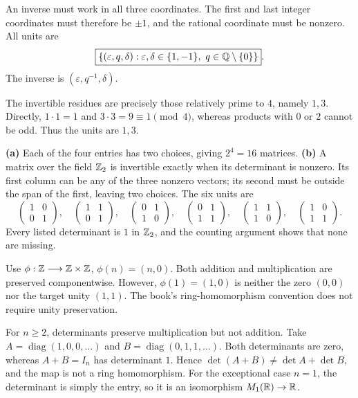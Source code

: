 An inverse must work in all three coordinates. The first and last integer coordinates must therefore be $\pm1$, and the rational coordinate must be nonzero. All units are
\[\boxed{\{(\varepsilon,q,\delta):\varepsilon,\delta\in\{1,-1\},\ q\in\Q\setminus\{0\}\}}.\]
The inverse is $(\varepsilon,q^{-1},\delta)$.

The invertible residues are precisely those relatively prime to $4$, namely $1,3$. Directly, $1\cdot1=1$ and $3\cdot3=9\equiv1\pmod4$, whereas products with $0$ or $2$ cannot be odd. Thus the units are $\boxed{1,3}$.

\textbf{(a)} Each of the four entries has two choices, giving $2^4=\boxed{16}$ matrices.
\textbf{(b)} A matrix over the field $\mathbb{Z}_2$ is invertible exactly when its determinant is nonzero. Its first column can be any of the three nonzero vectors; its second must be outside the span of the first, leaving two choices. The six units are
\[
\begin{pmatrix}1&0\\0&1\end{pmatrix},\quad
\begin{pmatrix}1&1\\0&1\end{pmatrix},\quad
\begin{pmatrix}0&1\\1&0\end{pmatrix},\quad
\begin{pmatrix}0&1\\1&1\end{pmatrix},\quad
\begin{pmatrix}1&1\\1&0\end{pmatrix},\quad
\begin{pmatrix}1&0\\1&1\end{pmatrix}.
\]
Every listed determinant is $1$ in $\mathbb{Z}_2$, and the counting argument shows that none are missing.

Use $\phi:\mathbb{Z}\longrightarrow\mathbb{Z}\times\mathbb{Z}$, $\phi(n)=(n,0)$. Both addition and multiplication are preserved componentwise. However, $\phi(1)=(1,0)$ is neither the zero $(0,0)$ nor the target unity $(1,1)$. The book's ring-homomorphism convention does not require unity preservation.

For $n\ge2$, determinants preserve multiplication but not addition. Take $A=\operatorname{diag}(1,0,0,\ldots)$ and $B=\operatorname{diag}(0,1,1,\ldots)$. Both determinants are zero, whereas $A+B=I_n$ has determinant $1$. Hence $\det(A+B)\ne\det A+\det B$, and the map is not a ring homomorphism. For the exceptional case $n=1$, the determinant is simply the entry, so it is an isomorphism $M_1(\mathbb{R})\to\mathbb{R}$.

